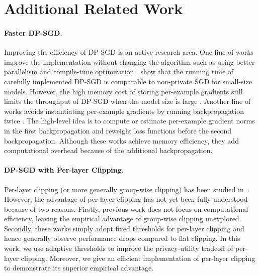 \clearpage
\newpage
\section{Additional Related Work}
\label{app:more_related}

\paragraph{Faster DP-SGD.} Improving the efficiency of DP-SGD is an active research area. One line of works improve the implementation  without changing the algorithm such as using better parallelism and compile-time optimization \citep{subramani2021enabling,anil2021large}. 
\cite{subramani2021enabling} show that the running time of carefully implemented DP-SGD is comparable  to non-private SGD for small-size models. 
However, the high memory cost of storing per-example gradients still limits the throughput of DP-SGD when the model size is large \citep{li2022large}. 
Another line of works avoids instantiating per-example gradients by running backpropagation twice \citep{goodfellow2015efficient,lee2021scaling,bu2021fast,li2022large,bu2022scalable}. The high-level idea is to compute or estimate per-example gradient norms in the first backpropagation and reweight loss functions before the second backpropagation.  Although these works achieve memory efficiency, they add computational overhead because of the additional backpropagation.

\paragraph{DP-SGD with Per-layer Clipping.} Per-layer clipping (or more generally group-wise clipping)  has been studied in~\cite{abadi2016deep,mcmahan2018general, mcmahan2018learning, dupuy2022efficient}. However, the advantage of per-layer clipping has not yet been fully understood because of two reasons. Firstly, previous work does not focus on computational efficiency, leaving the empirical advantage of group-wise clipping unexplored. Secondly, these works simply adopt fixed thresholds for per-layer clipping and hence generally observe performance drops compared to flat clipping. In this work, we use adaptive thresholds to improve the privacy-utility tradeoff of per-layer clipping. Moreover, we give an efficient implementation of per-layer clipping to demonstrate its superior empirical advantage. 

